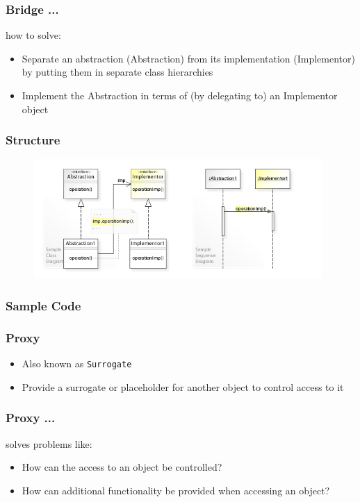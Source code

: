 \documentclass{beamer}
\begin{document}
\begin{frame}[fragile]
\frametitle{Bridge ...}

\begin{block}{how to solve:}
    \begin{itemize}
    \item Separate an abstraction (Abstraction) from its implementation (Implementor) by putting them in separate class hierarchies
    \item Implement the Abstraction in terms of (by delegating to) an Implementor object
    \end{itemize}
\end{block}

\end{frame}


\begin{frame}[fragile]
\frametitle{Structure}

 \begin{figure}[ht]
       \includegraphics[width=11cm]{./images/Bridge.jpg}
 \end{figure}

\end{frame}


\begin{frame}[fragile]
\frametitle{Sample Code}

\end{frame}



\begin{frame}[fragile]
\frametitle{Proxy}

\begin{itemize}
\item Also known as \texttt{Surrogate}
\item Provide a surrogate or placeholder for another object to control access to it
\end{itemize}

\end{frame}

\begin{frame}[fragile]
\frametitle{Proxy ...}

\begin{block}{solves problems like:}

\begin{itemize}
\item How can the access to an object be controlled?
\item How can additional functionality be provided when accessing an object?
\end{itemize}

\end{block}

\end{frame}
\end{document}
